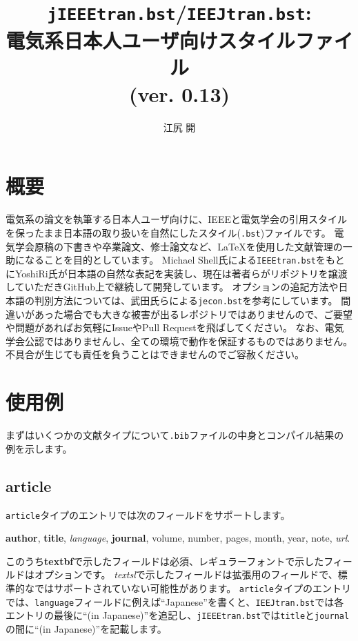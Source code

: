 \documentclass[10pt, a4paper]{jsarticle}
\title{\texttt{jIEEEtran.bst}/\texttt{IEEJtran.bst}:\\電気系日本人ユーザ向け\BibTeX スタイルファイル\\(ver. 0.13)}
\author{江尻 開}
\begin{document}
\maketitle
\tableofcontents



\section{概要}
\begin{bibunit}[jIEEEtran]

電気系の論文を執筆する日本人ユーザ向けに、IEEEと電気学会の引用スタイルを保ったまま日本語の取り扱いを自然にした\BibTeX スタイル(\texttt{.bst})ファイルです。
電気学会原稿の下書きや卒業論文、修士論文など、\LaTeX を使用した文献管理の一助になることを目的としています。
Michael Shell氏による\texttt{IEEEtran.bst}\cite{IEEEtran}をもとにYoshiRi氏が日本語の自然な表記を実装し、現在は著者らがリポジトリを譲渡していただきGitHub上\cite{jIEEEtran}で継続して開発しています。
オプションの追記方法や日本語の判別方法については、武田氏らによる\texttt{jecon.bst}\cite{jeconbst}を参考にしています。
間違いがあった場合でも大きな被害が出るレポジトリではありませんので、ご要望や問題があればお気軽にIssueやPull Requestを飛ばしてください。
なお、電気学会公認ではありませんし、全ての環境で動作を保証するものではありません。不具合が生じても責任を負うことはできませんのでご容赦ください。

{\small \putbib[ref]}
\end{bibunit}


\section{使用例}
まずはいくつかの文献タイプについて\texttt{.bib}ファイルの中身とコンパイル結果の例を示します。

\subsection{article}

\texttt{article}タイプのエントリでは次のフィールドをサポートします。
\begin{center}
\textbf{author}, \textbf{title}, \textsl{language}, \textbf{journal}, volume, number, pages, month, year, note, \textsl{url}.
\end{center}
このうち\textbf{textbf}で示したフィールドは必須、レギュラーフォントで示したフィールドはオプションです。
\textsl{textsl}で示したフィールドは拡張用のフィールドで、標準的な\BibTeX ではサポートされていない可能性があります。
\texttt{article}タイプのエントリでは、\texttt{language}フィールドに例えば``Japanese''を書くと、\texttt{IEEJtran.bst}では各エントリの最後に``(in Japanese)''を追記し、\texttt{jIEEEtran.bst}では\texttt{title}と\texttt{journal}の間に``(in Japanese)''を記載します。
\end{document}
